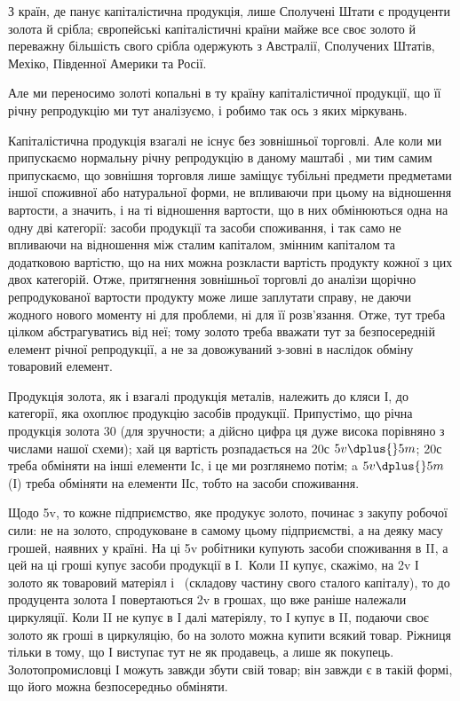 З країн, де панує капіталістична продукція, лише Сполучені Штати
є продуценти золота й срібла; європейські капіталістичні країни майже
все своє золото й переважну більшість свого срібла одержують з
Австралії, Сполучених Штатів, Мехіко, Південної Америки та Росії.

Але ми переносимо золоті копальні в ту країну капіталістичної продукції,
що її річну репродукцію ми тут аналізуємо, і робимо так ось з
яких міркувань.

Капіталістична продукція взагалі не існує без зовнішньої торговлі.
Але коли ми припускаємо нормальну річну репродукцію в даному маштабі
, ми тим самим припускаємо, що зовнішня торговля лише заміщує
тубільні предмети предметами іншої споживної або натуральної форми, не
впливаючи при цьому на відношення вартости, а значить, і на ті відношення
вартости, що в них обмінюються одна на одну дві категорії:
засоби продукції та засоби споживання, і так само не впливаючи на
відношення між сталим капіталом, змінним капіталом та додатковою
вартістю, що на них можна розкласти вартість продукту кожної з цих
двох категорій. Отже, притягнення зовнішньої торговлі до аналізи щорічно
репродукованої вартости продукту може лише заплутати справу, не даючи
жодного нового моменту ні для проблеми, ні для її розв’язання. Отже,
тут треба цілком абстрагуватись від неї; тому золото треба вважати тут
за безпосередній елемент річної репродукції, а не за довожуваний з-зовні
в наслідок обміну товаровий елемент.

Продукція золота, як і взагалі продукція металів, належить до кляси І,
до категорії, яка охоплює продукцію засобів продукції. Припустімо, що
річна продукція золота \deq{} 30 (для зручности; а дійсно цифра ця дуже
висока порівняно з числами нашої схеми); хай ця вартість розпадається
на 20с \dplus{} $5v \dplus{} 5m$; 20с треба обміняти на інші елементи Іс, і це ми розглянемо
потім; a $5v \dplus{} 5m$ (І) треба обміняти на елементи ІІс, тобто на
засоби споживання.

Щодо 5v, то кожне підприємство, яке продукує золото, починає з
закупу робочої сили: не на золото, спродуковане в самому цьому підприємстві,
а на деяку масу грошей, наявних у країні. На ці 5v робітники
купують засоби споживання в II, а цей на ці гроші купує засоби продукції
в І.~Коли II купує, скажімо, на 2v І золото як товаровий
матеріял і~ (складову частину свого сталого капіталу), то до продуцента
золота І повертаються 2v в грошах, що вже раніше належали
циркуляції. Коли II не купує в І далі матеріялу, то І купує в II, подаючи
своє золото як гроші в циркуляцію, бо на золото можна купити всякий
товар. Ріжниця тільки в тому, що І виступає тут не як продавець, а
лише як покупець. Золотопромисловці І можуть завжди збути свій товар;
він завжди є в такій формі, що його можна безпосередньо обміняти.

